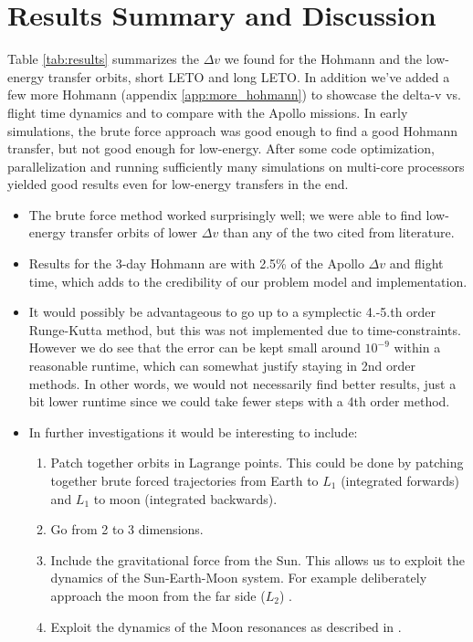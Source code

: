 \section{Results Summary and Discussion}
Table \ref{tab:results} summarizes the $\Delta v$ we found for the Hohmann and the low-energy transfer orbits, short LETO and long LETO. In addition we've added a few more Hohmann (appendix \ref{app:more_hohmann}) to showcase the delta-v vs. flight time dynamics and to compare with the Apollo missions. In early simulations, the brute force approach was good enough to find a good Hohmann transfer, but not good enough for low-energy. After some code optimization, parallelization and running sufficiently many simulations on multi-core processors yielded good results even for low-energy transfers in the end.
\begin{itemize}
    \item The brute force method worked surprisingly well; we were able to find low-energy transfer orbits of lower $\Delta v$ than any of the two cited from literature.
    \item Results for the 3-day Hohmann are with 2.5\% of the Apollo $\Delta v$ and flight time, which adds to the credibility of our problem model and implementation.
    \item It would possibly be advantageous to go up to a symplectic 4.-5.th order Runge-Kutta method, but this was not implemented due to time-constraints. However we do see that the error can be kept small around $10^{-9}$ within a reasonable runtime, which can somewhat justify staying in 2nd order methods. In other words, we would not necessarily find better results, just a bit lower runtime since we could take fewer steps with a 4th order method.
    \item In further investigations it would be interesting to include:
    \begin{enumerate}
        \item Patch together orbits in Lagrange points. This could be done by patching together brute forced trajectories from Earth to $L_1$ (integrated forwards) and $L_1$ to moon (integrated backwards).
        \item Go from 2 to 3 dimensions.
        \item Include the gravitational force from the Sun. This allows us to exploit the dynamics of the Sun-Earth-Moon system. For example deliberately approach the moon from the far side ($L_2$) \cite{Koon2001}.
        \item Exploit the dynamics of the Moon resonances as described in \cite{Topputo2005}.
    \end{enumerate}
\end{itemize}
